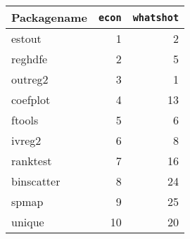 \begin{tabular}{lrr}\toprule
Packagename&\texttt{econ}&\texttt{whatshot}\\\midrule
estout&1&2\\
reghdfe&2&5\\
outreg2&3&1\\
coefplot&4&13\\
ftools&5&6\\
ivreg2&6&8\\
ranktest&7&16\\
binscatter&8&24\\
spmap&9&25\\
unique&10&20\\
\bottomrule\end{tabular}
